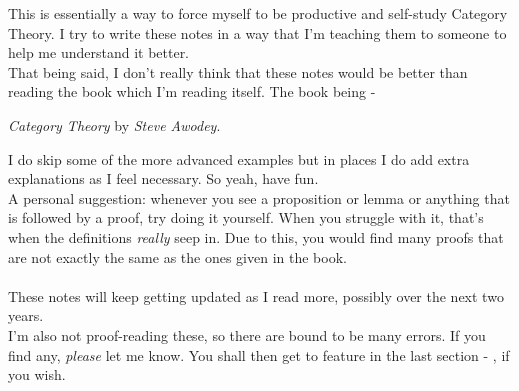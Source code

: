 This is essentially a way to force myself to be productive and self-study Category Theory. I try to write these notes in a way that I'm teaching them to someone to help me understand it better.\\
That being said, I don't really think that these notes would be better than reading the book which I'm reading itself. The book being - 
\begin{center}
	\emph{Category Theory} by \emph{Steve Awodey}.
\end{center}
I do skip some of the more advanced examples but in places I do add extra explanations as I feel necessary. So yeah, have fun.\\
A personal suggestion: whenever you see a proposition or lemma or anything that is followed by a proof, try doing it yourself. When you struggle with it, that's when the definitions \emph{really} seep in. Due to this, you would find many proofs that are not exactly the same as the ones given in the book. \\~\\
These notes will keep getting updated as I read more, possibly over the next two years.\\
I'm also not proof-reading these, so there are bound to be many errors. If you find any, \emph{please} let me know. You shall then get to feature in the last section - , if you wish.